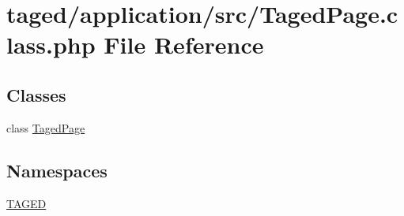 \hypertarget{_taged_page_8class_8php}{}\section{taged/application/src/\+Taged\+Page.class.\+php File Reference}
\label{_taged_page_8class_8php}
\subsection*{Classes}
\begin{DoxyCompactItemize}
\item 
class \hyperlink{class_taged_page}{Taged\+Page}
\end{DoxyCompactItemize}
\subsection*{Namespaces}
\begin{DoxyCompactItemize}
\item 
 \hyperlink{namespace_t_a_g_e_d}{T\+A\+G\+ED}
\end{DoxyCompactItemize}
